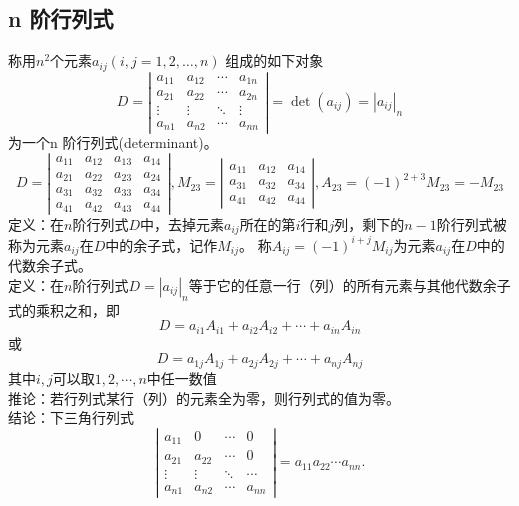 \subsection{n 阶行列式}
称用$n^2$个元素$a_{ij}  (i,j =1,2,…,n)$ 组成的如下对象
$$
D=\left|
\begin{array}{cccc} 
    a_{11} & a_{12} & \cdots & a_{1n} \\ 
    a_{21} & a_{22} & \cdots & a_{2n} \\ 
    \vdots & \vdots & \ddots & \vdots \\
    a_{n1} & a_{n2} & \cdots & a_{nn} 
\end{array}
\right|=\det(a_{ij})=|a_{ij}|_{n}
$$
为一个n 阶行列式(determinant)。
$$
D=\left|
\begin{array}{cccc} 
    a_{11} & a_{12} & a_{13} & a_{14} \\
    a_{21} & a_{22} & a_{23} & a_{24} \\
    a_{31} & a_{32} & a_{33} & a_{34} \\
    a_{41} & a_{42} & a_{43} & a_{44} 
\end{array}\right|,
M_{23}=\left|
\begin{array}{ccc} 
    a_{11} & a_{12} & a_{14} \\
    a_{31} & a_{32} & a_{34} \\
    a_{41} & a_{42} & a_{44} 
\end{array}\right|,A_{23}=(-1)^{2+3}M_{23}=-M_{23}
$$
{\color{red}定义：}在$n$阶行列式$D$中，去掉元素$a_{ij}$所在的第$i$行和$j$列，剩下的$n-1$阶行列式被称为元素$a_{ij}$在$D$中的余子式，记作$M_{ij}$。
称$A_{ij}=(-1)^{i+j}M_{ij}$为元素$a_{ij}$在$D$中的代数余子式。\\
{\color{red}定义：}在$n$阶行列式$D=|a_{ij}|_{n}$等于它的任意一行（列）的所有元素与其他代数余子式的乘积之和，即
$$
D=a_{i1}A_{i1}+a_{i2}A_{i2}+\cdots+a_{in}A_{in}
$$
或
$$
D=a_{1j}A_{1j}+a_{2j}A_{2j}+\cdots+a_{nj}A_{nj}
$$
其中$i,j$可以取$1,2,\cdots,n$中任一数值\\
{\color{blue}推论：}若行列式某行（列）的元素全为零，则行列式的值为零。\\
{\color{green}结论：下三角行列式}
$$
\left|\begin{array}{cccc} 
    a_{11} & 0 & \cdots & 0 \\
    a_{21} & a_{22} & \cdots & 0 \\
    \vdots & \vdots & \ddots & \cdots \\
    a_{n1} & a_{n2} & \cdots & a_{nn} 
\end{array}\right|=a_{11}a_{22}\cdots a_{nn}.
$$
